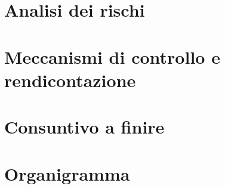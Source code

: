 \section{Analisi dei rischi}

\newpage
\section{Meccanismi di controllo e rendicontazione}

\newpage
\section{Consuntivo a finire}

\newpage
\appendix 
\section{Organigramma}

\newpage


